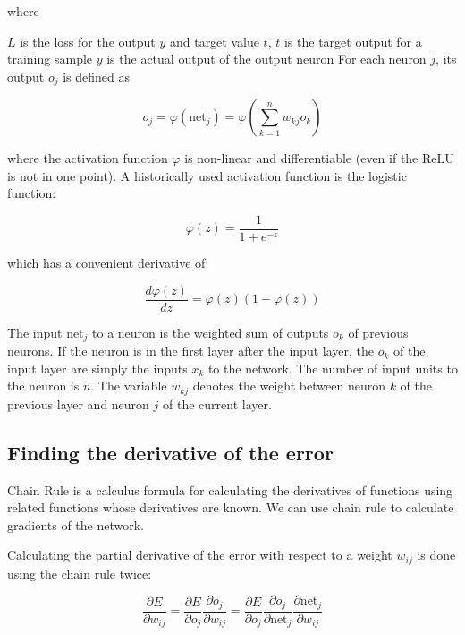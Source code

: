 where

$L$ is the loss for the output $y$ and target value $t$,
$t$ is the target output for a training sample
$y$ is the actual output of the output neuron
For each neuron $j$, its output $o_{j}$ is defined as

\begin{equation}
    \label{eq:gradient_net_output}
    o_{j}=\varphi ({\text{net}}_{j})=\varphi \left(\sum _{k=1}^{n}w_{kj}o_{k}\right)
\end{equation}

where the activation function $\varphi$  is non-linear and differentiable (even if the ReLU is not in one point). A historically used activation function is the logistic function:

\begin{equation}
    \label{eq:activation}
    \varphi (z)={\frac {1}{1+e^{-z}}}
\end{equation}

which has a convenient derivative of:

\begin{equation}
    \label{eq:activation_derivative}
    \frac {d\varphi (z)}{dz}=\varphi (z)(1-\varphi (z))
\end{equation}

The input $\text{net}_{j}$ to a neuron is the weighted sum of outputs $o_k$ of previous neurons. If the neuron is in the first layer after the input layer, the $o_k$ of the input layer are simply the inputs $x_{k}$ to the network. The number of input units to the neuron is $n$. The variable $w_{kj}$ denotes the weight between neuron $k$ of the previous layer and neuron $j$ of the current layer.

\subsection{Finding the derivative of the error}

Chain Rule is a calculus formula for calculating the derivatives of functions using related functions whose derivatives are known. We can use chain rule to calculate gradients of the network.

Calculating the partial derivative of the error with respect to a weight $w_{ij}$ is done using the chain rule twice:

\begin{equation}
    \label{eq:chain-1}
    {\frac {\partial E}{\partial w_{ij}}}={\frac {\partial E}{\partial o_{j}}}{\frac {\partial o_{j}}{\partial w_{ij}}}={\frac {\partial E}{\partial o_{j}}}{\frac {\partial o_{j}}{\partial {\text{net}}_{j}}}{\frac {\partial {\text{net}}_{j}}{\partial w_{ij}}}
\end{equation}

